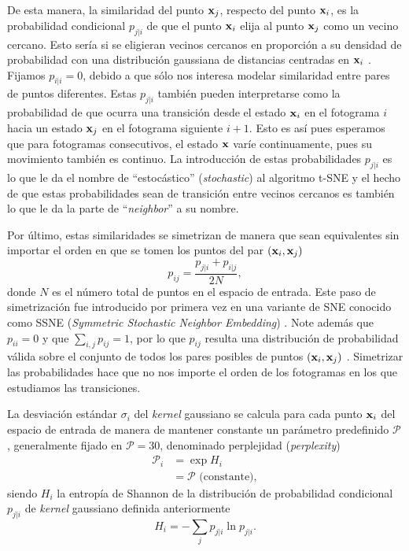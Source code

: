 De esta manera, la similaridad del punto $\vb{x}_j$, respecto del punto $\vb{x}_i$, es la probabilidad condicional $p_{j|i}$ de que el punto $\vb{x}_i$ elija al punto $\vb{x}_j$ como un vecino cercano. Esto sería si se eligieran vecinos cercanos en proporción a su densidad de probabilidad con una distribución gaussiana de distancias centradas en $\vb{x}_i$ \cite{vdm_tsne}. Fijamos $p_{i|i} = 0$, debido a que sólo nos interesa modelar similaridad entre pares de puntos diferentes. Estas $p_{j|i}$ también pueden interpretarse como la probabilidad de que ocurra una transición desde el estado $\vb{x}_i$ en el fotograma $i$ hacia un estado $\vb{x}_j$ en el fotograma siguiente $i+1$. Esto es así pues esperamos que para fotogramas consecutivos, el estado $\vb{x}$ varíe continuamente, pues su movimiento también es continuo. La introducción de estas probabilidades $p_{j|i}$ es lo que le da el nombre de ``estocástico'' (\textit{stochastic}) al algoritmo t-SNE y el hecho de que estas probabilidades sean de transición entre vecinos cercanos es también lo que le da la parte de ``\textit{neighbor}'' a su nombre.

Por último, estas similaridades se simetrizan de manera que sean equivalentes sin importar el orden en que se tomen los puntos del par $(\vb{x}_{i}, \vb{x}_{j})$
\begin{equation}
    p_{ij} = \frac{p_{j|i}+p_{i|j}}{2N},
\end{equation}
donde $N$ es el número total de puntos en el espacio de entrada. Este paso de simetrización fue introducido por primera vez en una variante de SNE conocido como SSNE (\textit{Symmetric Stochastic Neighbor Embedding}) \cite{yang_ssne}. Note además que $p_{ii} = 0$ y que $\sum_{i,j} p_{ij} = 1$, por lo que $p_{ij}$ resulta una distribución de probabilidad válida sobre el conjunto de todos los pares posibles de puntos $(\vb{x}_i, \vb{x}_j)$ \cite{kobak_art}. Simetrizar las probabilidades hace que no nos importe el orden de los fotogramas en los que estudiamos las transiciones.

La desviación estándar $\sigma_i$ del \textit{kernel} gaussiano se calcula para cada punto $\vb{x}_i$ del espacio de entrada de manera de mantener constante un parámetro predefinido $\mathcal{P}$, generalmente fijado en $\mathcal{P} = 30$, denominado perplejidad (\textit{perplexity})
\begin{align}
    \mathcal{P}_i &= \exp{H_i}\\
    &= \mathcal{P} \text{ (constante)},
\end{align}
siendo $H_i$ la entropía de Shannon de la distribución de probabilidad condicional $p_{j|i}$ de \textit{kernel} gaussiano definida anteriormente
\begin{equation}
    H_i = -\sum_{j} p_{j|i} \ln p_{j|i}.
\end{equation}

